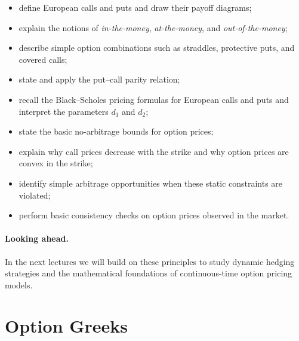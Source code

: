 \documentclass[11pt]{article}
\newcommand{\1}{\mathbf{1}}
\theoremstyle{plain}
\theoremstyle{definition}
\theoremstyle{remark}
\begin{document}
\begin{itemize}[leftmargin=1.4em]
    \item define European calls and puts and draw their payoff diagrams;

    \item explain the notions of \emph{in-the-money}, \emph{at-the-money},
    and \emph{out-of-the-money};

    \item describe simple option combinations such as straddles,
    protective puts, and covered calls;

    \item state and apply the put--call parity relation;

    \item recall the Black--Scholes pricing formulas for European calls
    and puts and interpret the parameters \(d_1\) and \(d_2\);

    \item state the basic no-arbitrage bounds for option prices;

    \item explain why call prices decrease with the strike and why
    option prices are convex in the strike;

    \item identify simple arbitrage opportunities when these
    static constraints are violated;

    \item perform basic consistency checks on option prices
    observed in the market.
\end{itemize}

\paragraph{Looking ahead.}

In the next lectures we will build on these principles to study
dynamic hedging strategies and the mathematical foundations of
continuous-time option pricing models.


\appendix
\section{Option Greeks}
\end{document}
